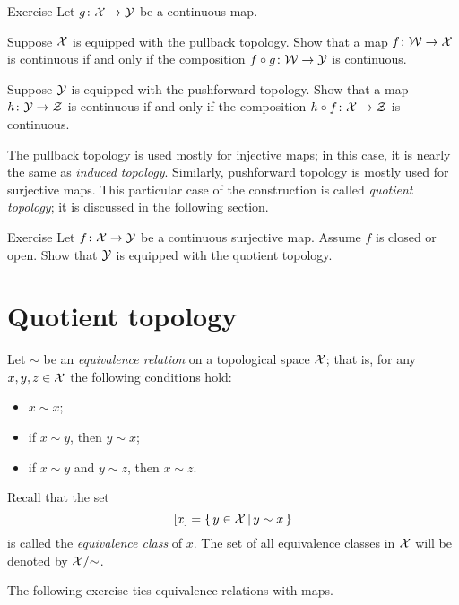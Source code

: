 \begin{thm}{Exercise}
Let $g\colon\mathcal{X}\to\mathcal{Y}$ be a continuous map.

\begin{subthm}{}
Suppose $\mathcal{X}$ is equipped with the pullback topology.
Show that a map $f\colon\mathcal{W}\to\mathcal{X}$ is continuous if and only if the composition $f\circ g\colon\mathcal{W}\to\mathcal{Y}$ is continuous.
\end{subthm}

\begin{subthm}{}
Suppose $\mathcal{Y}$ is equipped with the pushforward topology.
Show that a map $h\colon\mathcal{Y}\to\mathcal{Z}$ is continuous if and only if the composition $h\circ f\colon\mathcal{X}\to\mathcal{Z}$ is continuous.
\end{subthm}

\end{thm}


The pullback topology is used mostly for injective maps; in this case, it is nearly the same as \emph{induced topology}.
Similarly, pushforward topology is mostly used for surjective maps.
This particular case of the construction is called \emph{quotient topology};
it is discussed in the following section.

\begin{thm}{Exercise}\label{ex:open-closed-pushforward}
Let $f\colon\mathcal{X}\to \mathcal{Y}$ be a continuous surjective map.
Assume $f$ is closed or open.
Show that $\mathcal{Y}$ is equipped with the quotient topology.
\end{thm}

\section{Quotient topology}

Let $\sim$ be an \emph{equivalence relation} on a topological space $\mathcal{X}$;
that is, for any $x,y,z\in\mathcal{X}$ the following conditions hold:
\begin{itemize}
 \item $x\sim x$;
 \item if $x\sim y$, then $y\sim x$;
 \item if $x\sim y$ and $y\sim z$, then $x\sim z$.
\end{itemize}

Recall that the set 
\[[x]=\left\{\,{y\in \mathcal{X}}\,\middle|\,{y\sim x}\,\right\}\]
is called the \emph{equivalence class} of $x$.
The set of all equivalence classes in $\mathcal{X}$ will be denoted by $\mathcal{X}/{\sim}$.

The following exercise ties equivalence relations with maps.


